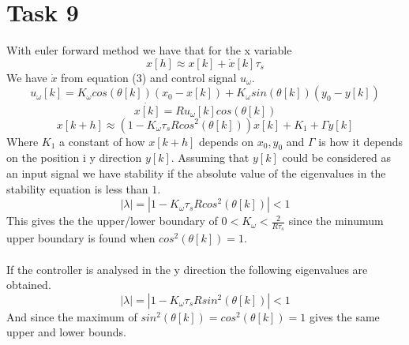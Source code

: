 \documentclass[a4paper,12pt,oneside,onecolumn]{article} %
\begin{document}
\section*{Task 9}
With euler forward method we have that for the x variable
\begin{equation*}
x[h]\approx x[k]+\dot{x}[k]\tau_s
\end{equation*}
We have $\dot{x}$ from equation (3) and control signal $u_\omega$.
\begin{equation*}
u_\omega [k] = K_{\omega} cos(\theta [k])(x_0 - x[k])+K_{\omega}sin(\theta [k]) (y_0-y[k])
\end{equation*}
\begin{equation*}
\dot{x[k]} = R u_\omega [k] cos(\theta[k])
\end{equation*}
\begin{equation*}
x[k+h]\approx  (1-K_\omega\tau_sRcos^2(\theta[k]))x[k]+K_1+\Gamma y[k]
\end{equation*}
Where $K_1$ a constant of how $x[k+h]$ depends on $x_0, y_0$ and $\Gamma$ is how it depends on the position i y direction $y[k]$. Assuming that $y[k]$ could be considered as an input signal we have stability if the absolute value of the eigenvalues in the stability equation is less than $1$.
\begin{equation*}
|\lambda |=|1-K_\omega\tau_sRcos^2(\theta[k])|<1
\end{equation*}
This gives the the upper/lower boundary of $0<K_\omega<\frac{2}{R\tau_s}$ since the minumum upper boundary is found when $cos^2(\theta[k])=1$.\\\\
If the controller is analysed in the y direction the following eigenvalues are obtained.
\begin{equation*}
|\lambda |=|1-K_\omega\tau_sRsin^2(\theta[k])|<1
\end{equation*} And since the maximum of $sin^2(\theta[k])=cos^2(\theta[k])=1$ gives the same upper and lower bounds.
\end{document}
